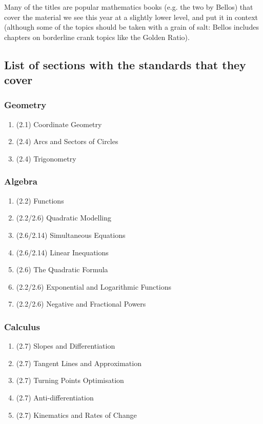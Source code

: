 Many of the titles are popular mathematics books (e.g. the two by Bellos) that cover the material we see this year at a slightly lower
level, and put it in context (although some of the topics should be taken with a grain of salt: Bellos includes chapters on borderline
crank topics like the Golden Ratio).

\subsection*{List of sections with the standards that they cover}
\subsubsection*{Geometry}
\begin{enumerate}
  \item (2.1) Coordinate Geometry
  \item (2.4) Arcs and Sectors of Circles
  \item (2.4) Trigonometry
\end{enumerate}

\subsubsection*{Algebra}
\begin{enumerate}[resume]
  \item (2.2) Functions
  \item (2.2/2.6) Quadratic Modelling
  \item (2.6/2.14) Simultaneous Equations
  \item (2.6/2.14) Linear Inequations
  \item (2.6) The Quadratic Formula
  \item (2.2/2.6) Exponential and Logarithmic Functions
  \item (2.2/2.6) Negative and Fractional Powers
\end{enumerate}

\subsubsection*{Calculus}
\begin{enumerate}[resume]
  \item (2.7) Slopes and Differentiation
  \item (2.7) Tangent Lines and Approximation
  \item (2.7) Turning Points Optimisation
  \item (2.7) Anti-differentiation
  \item (2.7) Kinematics and Rates of Change
\end{enumerate}

